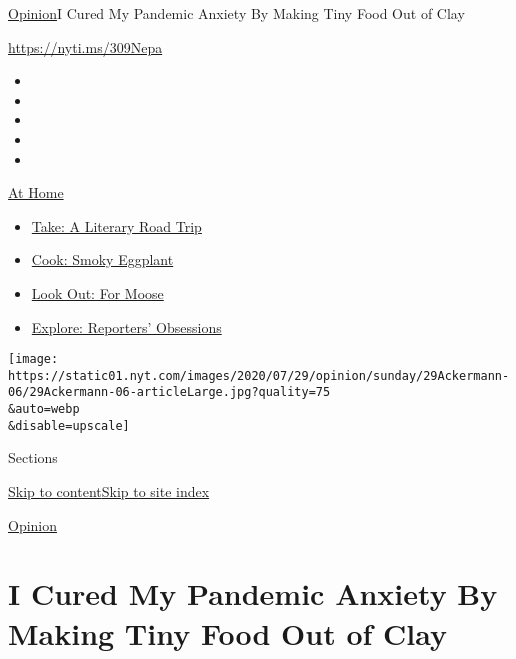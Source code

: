 \href{/section/opinion}{Opinion}\textbar{}I Cured My Pandemic Anxiety By
Making Tiny Food Out of Clay

\url{https://nyti.ms/309Nepa}

\begin{itemize}
\item
\item
\item
\item
\item
\end{itemize}

\href{https://www.nytimes.com/spotlight/at-home?action=click\&pgtype=Article\&state=default\&region=TOP_BANNER\&context=at_home_menu}{At
Home}

\begin{itemize}
\tightlist
\item
  \href{https://www.nytimes.com/2020/07/28/books/time-for-a-literary-road-trip.html?action=click\&pgtype=Article\&state=default\&region=TOP_BANNER\&context=at_home_menu}{Take:
  A Literary Road Trip}
\item
  \href{https://www.nytimes.com/2020/07/29/magazine/bored-with-your-home-cooking-some-smoky-eggplant-will-fix-that.html?action=click\&pgtype=Article\&state=default\&region=TOP_BANNER\&context=at_home_menu}{Cook:
  Smoky Eggplant}
\item
  \href{https://www.nytimes.com/2020/07/27/travel/moose-michigan-isle-royale.html?action=click\&pgtype=Article\&state=default\&region=TOP_BANNER\&context=at_home_menu}{Look
  Out: For Moose}
\item
  \href{https://www.nytimes.com/interactive/2020/at-home/even-more-reporters-editors-diaries-lists-recommendations.html?action=click\&pgtype=Article\&state=default\&region=TOP_BANNER\&context=at_home_menu}{Explore:
  Reporters' Obsessions}
\end{itemize}

\texttt{[image: https://static01.nyt.com/images/2020/07/29/opinion/sunday/29Ackermann-06/29Ackermann-06-articleLarge.jpg?quality=75\\\&auto=webp\\\&disable=upscale]}

Sections

\protect\hyperlink{site-content}{Skip to
content}\protect\hyperlink{site-index}{Skip to site index}

\href{/section/opinion}{Opinion}

\hypertarget{i-cured-my-pandemic-anxiety-by-making-tiny-food-out-of-clay}{%
\section{I Cured My Pandemic Anxiety By Making Tiny Food Out of
Clay}\label{i-cured-my-pandemic-anxiety-by-making-tiny-food-out-of-clay}}

